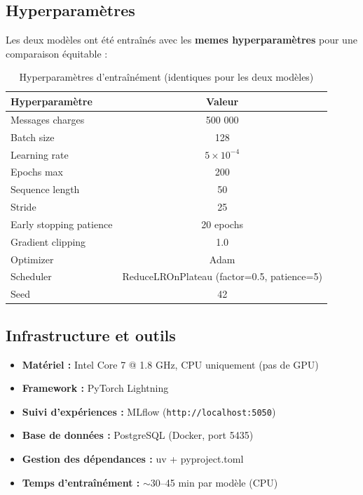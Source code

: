 \documentclass[12pt,a4paper]{article}
\begin{document}
\subsection{Hyperparamètres}

Les deux modèles ont été entraînés avec les \textbf{memes hyperparamètres} pour une comparaison équitable :

\begin{table}[H]
\centering
\begin{tabular}{lc}
\toprule
\textbf{Hyperparamètre} & \textbf{Valeur} \\
\midrule
Messages charges & 500 000 \\
Batch size & 128 \\
Learning rate & $5 \times 10^{-4}$ \\
Epochs max & 200 \\
Sequence length & 50 \\
Stride & 25 \\
Early stopping patience & 20 epochs \\
Gradient clipping & 1.0 \\
Optimizer & Adam \\
Scheduler & ReduceLROnPlateau (factor=0.5, patience=5) \\
Seed & 42 \\
\bottomrule
\end{tabular}
\caption{Hyperparamètres d'entraînément (identiques pour les deux modèles)}
\end{table}

\subsection{Infrastructure et outils}

\begin{itemize}[noitemsep]
    \item \textbf{Matériel :} Intel Core 7 @ 1.8 GHz, CPU uniquement (pas de GPU)
    \item \textbf{Framework :} PyTorch Lightning
    \item \textbf{Suivi d'expériences :} MLflow (\texttt{http://localhost:5050})
    \item \textbf{Base de données :} PostgreSQL (Docker, port 5435)
    \item \textbf{Gestion des dépendances :} uv + pyproject.toml
    \item \textbf{Temps d'entraînément :} $\sim$30--45 min par modèle (CPU)
\end{itemize}
\end{document}
